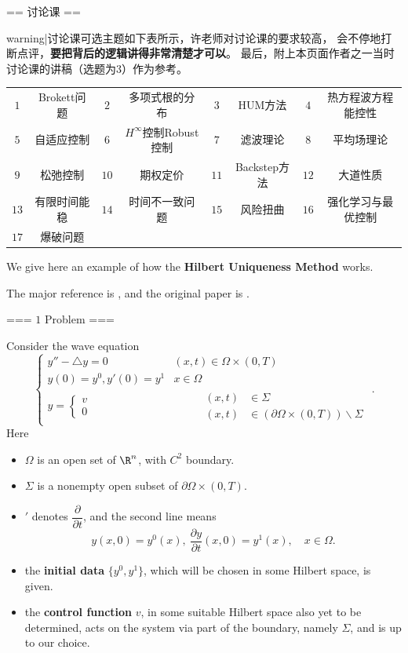 == 讨论课 ==

{{warning|讨论课可选主题如下表所示，许老师对讨论课的要求较高，
会不停地打断点评，\textbf{要把背后的逻辑讲得非常清楚才可以}。
最后，附上本页面作者之一当时讨论课的讲稿（选题为$3$）作为参考。}}

\begin{center}\begin{tabular}{cccccccc}
    $1$ & Brokett问题 & $2$ & 多项式根的分布 &
    $3$ & HUM方法 & $4$ & 热方程波方程能控性\\
    $5$ & 自适应控制 & $6$ & $H^\infty$控制Robust控制 &
    $7$ & 滤波理论 & $8$ & 平均场理论\\
    $9$ & 松弛控制 & $10$ & 期权定价 &
    $11$ & Backstep方法 & $12$ & 大道性质\\
    $13$ & 有限时间能稳 & $14$ & 时间不一致问题 &
    $15$ & 风险扭曲 & $16$ & 强化学习与最优控制\\
    $17$ & 爆破问题
\end{tabular}\end{center}
We give here an example of how the \textbf{Hilbert Uniqueness Method} works.

The major reference is \cite{L1}, and the original paper is \cite{L2}.

=== $\boxed{1}$ Problem ===

Consider the wave equation
\[
    \left\{\begin{array}{l}
        y''-\triangle y=0 &(x,t)\in\Omega\times(0,T)\\
        y(0)=y^0,y'(0)=y^1 &\!\!\!\!\!\!\!\!\!\!\!\!\!x\in\Omega\\
        y=\begin{cases}v\\0\end{cases} &\qquad\ \ 
        \begin{aligned}
            (x,t)&\in\Sigma\\
            (x,t)&\in(\partial\Omega\times(0,T))\backslash\Sigma
        \end{aligned}
    \end{array}\right..
\]
Here
\begin{itemize}
    \item $\Omega$ is an open set of $\R^n$, with $C^2$ boundary.
    \item $\Sigma$ is a nonempty open subset of $\partial\Omega\times(0,T)$.
    \item $'$ denotes $\dfrac{\partial}{\partial t}$, and the second line means 
    \[y(x,0)=y^0(x), \ \frac{\partial y}{\partial t}(x,0)=y^1(x),\quad x\in\Omega.\]
    \item the \textbf{initial data} $\{y^0,y^1\}$, 
    which will be chosen in some Hilbert space, is given.
    \item the \textbf{control function} $v$, 
    in some suitable Hilbert space also yet to be determined, 
    acts on the system via part of the boundary, namely $\Sigma$, 
    and is up to our choice.
\end{itemize}

